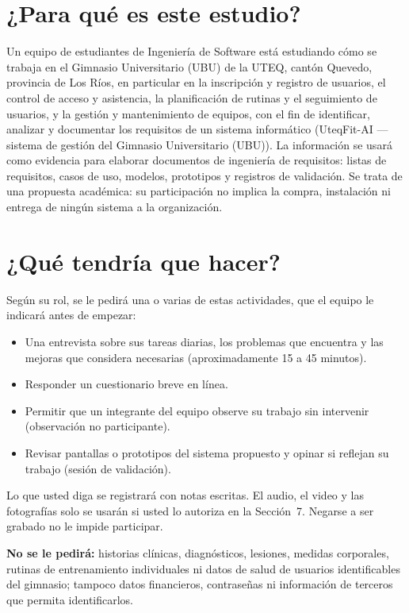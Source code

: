 \documentclass[11pt,a4paper]{article}
\begin{document}
\section{¿Para qué es este estudio?}
Un equipo de estudiantes de Ingeniería de Software está estudiando cómo se trabaja en el Gimnasio Universitario (UBU) de la UTEQ, cantón Quevedo, provincia de Los Ríos, en particular en la inscripción y registro de usuarios, el control de acceso y asistencia, la planificación de rutinas y el seguimiento de usuarios, y la gestión y mantenimiento de equipos, con el fin de identificar, analizar y documentar los requisitos de un sistema informático (UteqFit-AI --- sistema de gestión del Gimnasio Universitario (UBU)). La información se usará como evidencia para elaborar documentos de ingeniería de requisitos: listas de requisitos, casos de uso, modelos, prototipos y registros de validación. Se trata de una propuesta académica: su participación no implica la compra, instalación ni entrega de ningún sistema a la organización.

\section{¿Qué tendría que hacer?}
Según su rol, se le pedirá una o varias de estas actividades, que el equipo le indicará antes de empezar:
\begin{itemize}[leftmargin=*,itemsep=2pt]
  \item Una entrevista sobre sus tareas diarias, los problemas que encuentra y las mejoras que considera necesarias (aproximadamente 15 a 45 minutos).
  \item Responder un cuestionario breve en línea.
  \item Permitir que un integrante del equipo observe su trabajo sin intervenir (observación no participante).
  \item Revisar pantallas o prototipos del sistema propuesto y opinar si reflejan su trabajo (sesión de validación).
\end{itemize}
Lo que usted diga se registrará con notas escritas. El audio, el video y las fotografías solo se usarán si usted lo autoriza en la Sección~7. Negarse a ser grabado no le impide participar.

\textbf{No se le pedirá:} historias clínicas, diagnósticos, lesiones, medidas corporales, rutinas de entrenamiento individuales ni datos de salud de usuarios identificables del gimnasio; tampoco datos financieros, contraseñas ni información de terceros que permita identificarlos.
\end{document}
